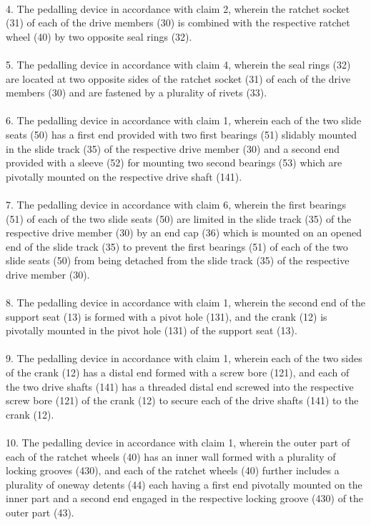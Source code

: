 \documentclass[10pt, a4paper]{article}
\newcommand{\myclaimsline}[3]{
	\normalsize
	#1. #2\\\\
}
\begin{document}
{{		} \\
		\myclaimsline{4}{The pedalling device in accordance with claim 2, wherein the ratchet socket (31) of each of the drive members (30) is combined with the respective ratchet wheel (40) by two opposite seal rings (32).  
		} \\
		\myclaimsline{5}{The pedalling device in accordance with claim 4, wherein the seal rings (32) are located at two opposite sides of the ratchet socket (31) of each of the drive members (30) and are fastened by a plurality of rivets (33). 
		} \\
		\myclaimsline{6}{The pedalling device in accordance with claim 1, wherein each of the two slide seats (50) has a first end provided with two first bearings (51) slidably mounted in the slide track (35) of the respective drive member (30) and a second end provided with a sleeve (52) for mounting two second bearings (53) which are pivotally mounted on the respective drive shaft (141).
		} \\
		\myclaimsline{7}{The pedalling device in accordance with claim 6, wherein the first bearings (51) of each of the two slide seats (50) are limited in the slide track (35) of the respective drive member (30) by an end cap (36) which is mounted on an opened end of the slide track (35) to prevent the first bearings (51) of each of the two slide seats (50) from being detached from the slide track (35) of the respective drive member (30). 
		} \\
		\myclaimsline{8}{The pedalling device in accordance with claim 1, wherein the second end of the support seat (13) is formed with a pivot hole (131), and the crank (12) is pivotally mounted in the pivot hole (131) of the support seat (13). 
		} \\
		\myclaimsline{9}{The pedalling device in accordance with claim 1, wherein each of the two sides of the crank (12) has a distal end formed with a screw bore (121), and each of the two drive shafts (141) has a threaded distal end screwed into the respective screw bore (121) of the crank (12) to secure each of the drive shafts (141) to the crank (12).
		} \\
		\myclaimsline{10}{The pedalling device in accordance with claim 1, wherein the outer part of each of the ratchet wheels (40) has an inner wall formed with a plurality of locking grooves (430), and each of the ratchet wheels (40) further includes a plurality of oneway detents (44) each having a first end pivotally mounted on the inner part and a second end engaged in the respective locking groove (430) of the outer part (43). 
		} \\
	}
	
\end{document}
